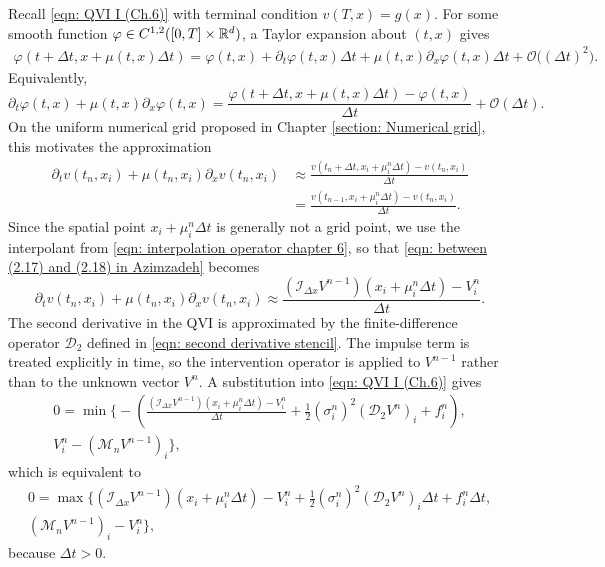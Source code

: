 Recall \eqref{eqn: QVI I (Ch.6)} with terminal condition $v(T,x) = g(x)$. For some smooth function $\varphi \in C^{1,2}([0,T] \times \mathbb{R}^d)$, a Taylor expansion about $(t,x)$ gives
\begin{align*}
    \varphi(t + \Delta t, x + \mu(t,x) \Delta t) = \varphi(t,x) + \partial_t \varphi(t,x) \Delta t + \mu(t,x) \partial_x \varphi(t,x) \Delta t + \mathcal{O}\big((\Delta t)^2 \big).
\end{align*}
Equivalently, 
\begin{equation*}
    \partial_t \varphi(t,x) + \mu(t,x) \partial_x \varphi(t,x) = \frac{\varphi(t + \Delta t, x + \mu(t,x) \Delta t) - \varphi(t,x)}{\Delta t} + \mathcal{O}(\Delta t). 
\end{equation*}
On the uniform numerical grid proposed in Chapter \ref{section: Numerical grid}, this motivates the approximation
\begin{align}
    \partial_t v(t_n,x_i) + \mu(t_n,x_i) \partial_x v(t_n,x_i) & \approx \frac{v(t_n + \Delta t, x_i + \mu_i^n \Delta t) - v(t_n,x_i)}{\Delta t} \nonumber \\
    & = \frac{v(t_{n-1}, x_i + \mu_i^n \Delta t) - v(t_n,x_i)}{\Delta t}. \label{eqn: between (2.17) and (2.18) in Azimzadeh}
\end{align}
Since the spatial point $x_i + \mu_i^n \Delta t$ is generally not a grid point, we use the interpolant from \eqref{eqn: interpolation operator chapter 6}, so that \eqref{eqn: between (2.17) and (2.18) in Azimzadeh} becomes
\begin{equation*}
    \partial_t v(t_n,x_i) + \mu(t_n,x_i) \partial_x v(t_n,x_i) \approx \frac{(\mathcal{I}_{\Delta x}V^{n-1})(x_i+\mu_i^n \Delta t) - V_i^n}{\Delta t}.
    \label{eqn: (2.18) in Azimzadeh}
\end{equation*}
The second derivative in the QVI is approximated by the finite-difference operator $\mathcal D_2$ defined in \eqref{eqn: second derivative stencil}. The impulse term is treated explicitly in time, so the intervention operator is applied to $V^{n-1}$ rather than to the unknown vector $V^n$. A substitution into \eqref{eqn: QVI I (Ch.6)} gives
\begin{align*}
    0 = \min \bigg\{ - \left( \frac{(\mathcal{I}_{\Delta x} V^{n-1})(x_i+\mu_i^n \Delta t) - V_i^n}{\Delta t} + \frac{1}{2} (\sigma_i^n)^2 (\mathcal{D}_2 V^n)_i + f_i^n \right), \\
    V_i^n - (\mathcal{M}_n V^{n-1})_i \bigg\},
\end{align*}
which is equivalent to
\begin{align}
    0 = \max \bigg\{ (\mathcal{I}_{\Delta x} V^{n-1})(x_i+\mu_i^n \Delta t) - V_i^n + \frac{1}{2} (\sigma_i^n)^2 (\mathcal{D}_2 V^n)_i \Delta t + f_i^n \Delta t, \nonumber \\
    (\mathcal{M}_n V^{n-1})_i - V_i^n \bigg\},
    \label{eqn: Num. scheme temp. result}
\end{align}
because $\Delta t > 0$. 

